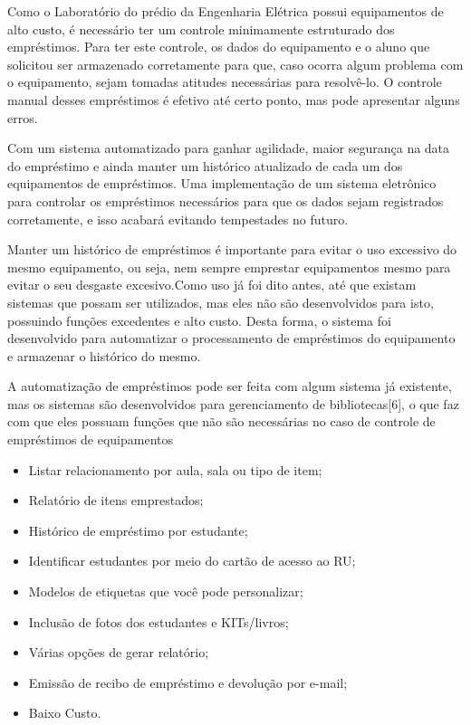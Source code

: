 \vspace{-42pt}
Como o Laboratório do prédio da Engenharia Elétrica possui equipamentos de alto custo, é necessário ter um controle minimamente estruturado dos empréstimos. Para ter este controle, os dados do equipamento e o aluno que solicitou ser armazenado corretamente para que, caso ocorra algum problema com o equipamento, sejam tomadas atitudes necessárias para resolvê-lo. O controle manual desses empréstimos é efetivo até certo ponto, mas pode apresentar alguns erros.

Com um sistema automatizado para ganhar agilidade, maior segurança na data do empréstimo e ainda manter um histórico atualizado de cada um dos equipamentos de empréstimos. Uma implementação de um sistema eletrônico para controlar os empréstimos necessários para que os dados sejam registrados corretamente, e isso acabará evitando tempestades no futuro.

Manter um histórico de empréstimos é importante para evitar o uso excessivo do mesmo equipamento, ou seja, nem sempre emprestar equipamentos mesmo para evitar o seu desgaste excesivo.Como uso já foi dito antes, até que existam sistemas que possam ser utilizados, mas eles não são desenvolvidos para isto, possuindo funções excedentes e alto custo. Desta forma, o sistema foi desenvolvido para automatizar o processamento de empréstimos do equipamento e armazenar o histórico do mesmo.

A automatização de empréstimos pode ser feita com algum sistema já existente, mas os sistemas são desenvolvidos para gerenciamento de bibliotecas[6], o que faz com que eles possuam funções que não são necessárias no caso de controle de empréstimos de equipamentos
\begin{itemize}
   \item Listar relacionamento por aula, sala ou tipo de item;
   \item Relatório de itens emprestados;
   \item Histórico de empréstimo por estudante;
   \item Identificar estudantes por meio do cartão de acesso ao RU;
   \item Modelos de etiquetas que você pode personalizar;
   \item Inclusão de fotos dos estudantes e KITs/livros;
   \item Várias opções de gerar relatório;
   \item Emissão de recibo de empréstimo e devolução por e-mail;
   \item Baixo Custo.
\end{itemize}

